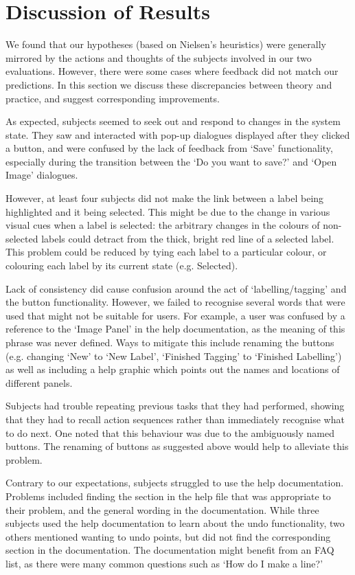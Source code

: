 \documentclass[11pt,twocolumn]{article}
\begin{document}
\section{Discussion of Results}

We found that our hypotheses (based on Nielsen’s heuristics) were generally
mirrored by the actions and thoughts of the subjects involved in our two
evaluations. However, there were some cases where feedback did not match our
predictions. In this section we discuss these discrepancies between theory and
practice, and suggest corresponding improvements.

As expected, subjects seemed to seek out and respond to changes in the system
state. They saw and interacted with pop-up dialogues displayed after they
clicked a button, and were confused by the lack of feedback from `Save'
functionality, especially during the transition between the `Do you want to
save?' and `Open Image' dialogues. 

However, at least four subjects did not make the link between a label being
highlighted and it being selected. This might be due to the change in various
visual cues when a label is selected: the arbitrary changes in the colours of
non-selected labels could detract from the thick, bright red line of a selected
label. This problem could be reduced by tying each label to a particular
colour, or colouring each label by its current state (e.g. Selected).

Lack of consistency did cause confusion around the act of `labelling/tagging'
and the button functionality. However, we failed to recognise several words
that were used that might not be suitable for users. For example, a user was
confused by a reference to the `Image Panel' in the help documentation, as the
meaning of this phrase was never defined. Ways to mitigate this include
renaming the buttons (e.g. changing `New' to `New Label', `Finished Tagging' to
`Finished Labelling') as well as including a help graphic which points out the
names and locations of different panels.

Subjects had trouble repeating previous tasks that they had performed, showing
that they had to recall action sequences rather than immediately recognise
what to do next. One noted that this behaviour was due to the ambiguously named
buttons. The renaming of buttons as suggested above would help to alleviate
this problem. 
 
Contrary to our expectations, subjects struggled to use the help documentation.
Problems included finding the section in the help file that was appropriate to
their problem, and the general wording in the documentation. While three
subjects used the help documentation to learn about the undo functionality, two
others mentioned wanting to undo points, but did not find the corresponding
section in the documentation. The documentation might benefit from an FAQ list,
as there were many common questions such as `How do I make a line?'
\end{document}
